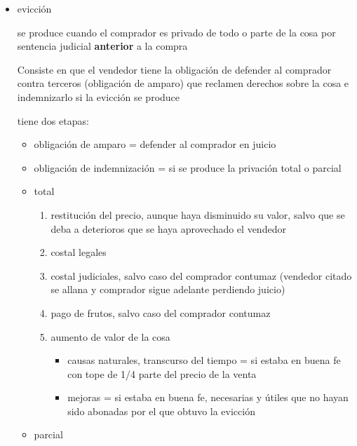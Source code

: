\documentclass[]{article}
\providecommand{\tightlist}{%
  \setlength{\itemsep}{0pt}\setlength{\parskip}{0pt}}
\begin{document}
\begin{itemize}
\begin{itemize}
\begin{itemize}
\begin{itemize}
        \begin{itemize}
        \item
          evicción

          se produce cuando el comprador es privado de todo o parte de
          la cosa por sentencia judicial \textbf{anterior} a la compra

          Consiste en que el vendedor tiene la obligación de defender al
          comprador contra terceros (obligación de amparo) que reclamen
          derechos sobre la cosa e indemnizarlo si la evicción se
          produce

          tiene dos etapas:

          \begin{itemize}
          \tightlist
          \item
            obligación de amparo = defender al comprador en juicio
          \item
            obligación de indemnización = si se produce la privación
            total o parcial
          \item
            total

            \begin{enumerate}
            \def\labelenumi{\arabic{enumi}.}
            \tightlist
            \item
              restitución del precio, aunque haya disminuido su valor,
              salvo que se deba a deterioros que se haya aprovechado el
              vendedor
            \item
              costal legales
            \item
              costal judiciales, salvo caso del comprador contumaz
              (vendedor citado se allana y comprador sigue adelante
              perdiendo juicio)
            \item
              pago de frutos, salvo caso del comprador contumaz
            \item
              aumento de valor de la cosa

              \begin{itemize}
              \tightlist
              \item
                causas naturales, transcurso del tiempo = si estaba en
                buena fe con tope de 1/4 parte del precio de la venta
              \item
                mejoras = si estaba en buena fe, necesarias y útiles que
                no hayan sido abonadas por el que obtuvo la evicción
              \end{itemize}
            \end{enumerate}
          \item
            parcial


\end{itemize}
\end{itemize}
\end{itemize}
\end{itemize}
\end{itemize}
\end{itemize}
\end{document}
